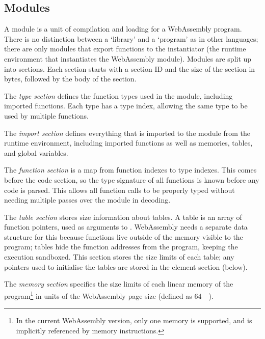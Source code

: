 \documentclass[00-main.tex]{subfiles}
\begin{document}
%
%

\subsection{Modules}

A module is a unit of compilation and loading for a WebAssembly program.
There is no distinction between a `library' and a `program' as in other languages; there are only modules that export functions to the instantiator (the runtime environment that instantiates the WebAssembly module).
Modules are split up into sections.
Each section starts with a section ID and the size of the section in bytes, followed by the body of the section.

The \emph{type section} defines the function types used in the module, including imported functions.
Each type has a type index, allowing the same type to be used by multiple functions.

The \emph{import section} defines everything that is imported to the module from the runtime environment, including imported functions as well as memories, tables, and global variables.

The \emph{function section} is a map from function indexes to type indexes.
This comes before the code section, so the type signature of all functions is known before any code is parsed.
This allows all function calls to be properly typed without needing multiple passes over the module in decoding.

The \emph{table section} stores size information about tables.
A table is an array of function pointers, used as arguments to .
WebAssembly needs a separate data structure for this because functions live outside of the memory visible to the program; tables hide the function addresses from the program, keeping the execution sandboxed.
This section stores the size limits of each table; any pointers used to initialise the tables are stored in the element section (below).

The \emph{memory section} specifies the size limits of each linear memory of the program\footnote{In the current WebAssembly version, only one memory is supported, and is implicitly referenced by memory instructions.} in units of the WebAssembly page size (defined as \SI{64}{\kibi\byte}).
\end{document}
